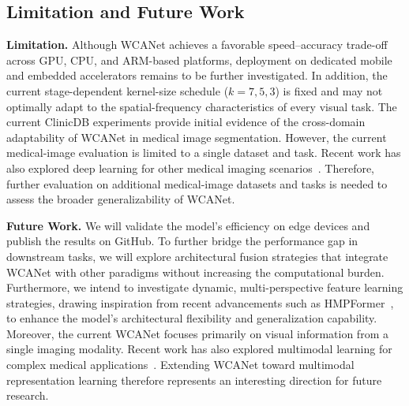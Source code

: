 \documentclass[a4paper,fleqn]{cas-dc}
\begin{document}














\subsection{Limitation and Future Work}


{ 
\textbf{Limitation.}
{\color{blue}
Although WCANet achieves a favorable speed--accuracy trade-off across GPU,
CPU, and ARM-based platforms, deployment on dedicated mobile and embedded
accelerators remains to be further investigated. In addition, the current
stage-dependent kernel-size schedule ($k=7,5,3$) is fixed and may not optimally
adapt to the spatial-frequency characteristics of every visual task.
The current ClinicDB experiments provide initial evidence of the cross-domain
adaptability of WCANet in medical image segmentation. However, the current
medical-image evaluation is limited to a single dataset and task. Recent work
has also explored deep learning for other medical imaging scenarios~\cite{bhuvaneshwari2025deep}.
Therefore, further evaluation on additional medical-image datasets and tasks
is needed to assess the broader generalizability of WCANet.
}

\textbf{Future Work.} We will validate the model's efficiency on edge devices and publish the results on GitHub. To further bridge the performance gap in downstream tasks, we will explore architectural fusion strategies that integrate WCANet with other paradigms without increasing the computational burden. Furthermore, we intend to investigate dynamic, multi-perspective feature learning strategies, drawing inspiration from recent advancements such as HMPFormer~\cite{usman2025hmpformer}, to enhance the model's architectural flexibility and generalization capability.
{\color{blue}
Moreover, the current WCANet focuses primarily on visual information from a
single imaging modality. Recent work has also explored multimodal learning for
complex medical applications~\cite{nelson2026multimodal}. Extending WCANet toward
multimodal representation learning therefore represents an interesting direction
for future research.
}
}
\end{document}
